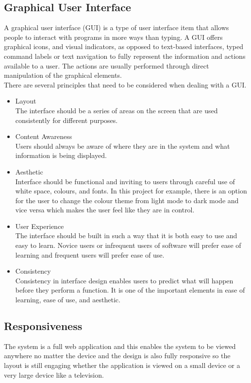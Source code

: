 \documentclass[twoside, a4paper, 12pt]{report}
\begin{document}
\subsection{Graphical User Interface}
A graphical user interface (GUI) is a type of user interface item that allows people to interact with programs in more ways than typing. A GUI offers graphical icons, and visual indicators, as opposed to text-based interfaces, typed command labels or text navigation to fully represent the information and actions available to a user. The actions are usually performed through direct manipulation of the graphical elements.\\
\indent
There are several principles that need to be considered when dealing with a GUI.
\begin{itemize}
\item Layout\\
The interface should be a series of areas on the screen that are used consistently for different purposes.
\item Content Awareness\\
Users should always be aware of where they are in the system and what information is being displayed.
\item Aesthetic\\
Interface should be functional and inviting to users through careful use of white space, colours, and fonts. In this project for example, there is an option for the user to change the colour theme from light mode to dark mode and vice versa which makes the user feel like they are in control.
\item User Experience\\
The interface should be built in such a way that it is both easy to use and easy to learn. Novice users or infrequent users of software will prefer ease of learning and frequent users will prefer ease of use.
\item Consistency\\
Consistency in interface design enables users to predict what will happen before they perform a function. It is one of the important elements in ease of learning, ease of use, and aesthetic.
\end{itemize}

\subsection{Responsiveness}
The system is a full web application and this enables the system to be viewed anywhere no matter the device and the design is also fully responsive so the layout is still engaging whether the application is viewed on a small device or a very large device like a television. 
\end{document}

